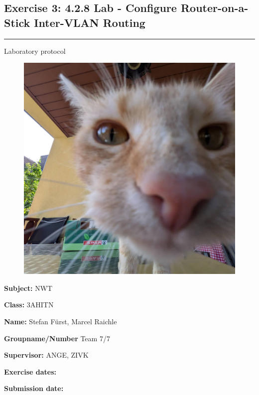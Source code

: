 \documentclass[a4paper]{article}
\newcommand{\abc}{\hfill \break}
\begin{document}
% 
\pagestyle{oida}
\subsection*{Exercise 3: 4.2.8 Lab - Configure Router-on-a-Stick Inter-VLAN Routing}
\par\noindent\rule{\textwidth}{0.4pt}

Laboratory protocol

\begin{figure}[h]
	\includegraphics[scale=0.2]{images/mika.jpeg}
	\centering
\end{figure}

\vspace*{\fill}
\textbf{Subject:}	NWT\abc

\textbf{Class:}	3AHITN\abc

\textbf{Name:}	Stefan Fürst, Marcel Raichle\abc

\textbf{Groupname/Number} Team 7/7\abc

\textbf{Supervisor:} 	ANGE, ZIVK\abc

\textbf{Exercise dates:}	\abc

\textbf{Submission date:}\abc

\abc \abc \abc \abc

\newpage
\tableofcontents
\end{document}
